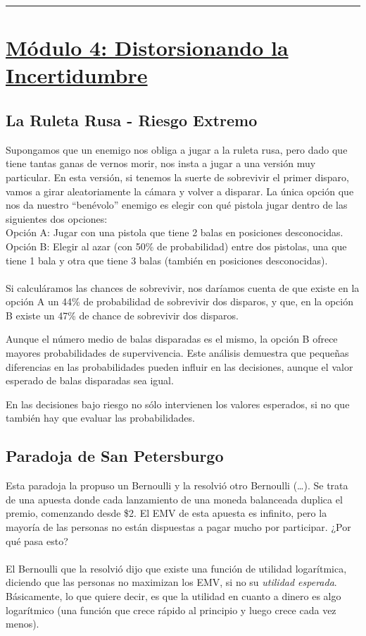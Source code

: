 \documentclass{article}
\newcommand*\sepline{%
  \begin{center}
    \rule[1ex]{.5\textwidth}{.5pt}
  \end{center}}
\begin{document}
    \sepline

    \section*{\underline{Módulo 4: Distorsionando la Incertidumbre}}
        \subsection*{La Ruleta Rusa - Riesgo Extremo}
            Supongamos que un enemigo nos obliga a jugar a la ruleta rusa, pero dado que tiene tantas ganas de vernos morir, nos insta a jugar a una versión muy particular. En esta versión, si tenemos la suerte de sobrevivir el primer disparo, vamos a girar aleatoriamente la cámara y volver a disparar. La única opción que nos da nuestro “benévolo” enemigo es elegir con qué pistola jugar dentro de las siguientes dos opciones: \\
            Opción A: Jugar con una pistola que tiene 2 balas en posiciones desconocidas. \\
            Opción B: Elegir al azar (con 50\% de probabilidad) entre dos pistolas, una que tiene 1 bala y otra que tiene 3 balas (también en posiciones desconocidas). \\
            \\
            Si calculáramos las chances de sobrevivir, nos daríamos cuenta de que existe en la opción A un 44\% de probabilidad de sobrevivir dos disparos, y que, en la opción B existe un 47\% de chance de sobrevivir dos disparos.

            Aunque el número medio de balas disparadas es el mismo, la opción B ofrece mayores probabilidades de supervivencia. Este análisis demuestra que pequeñas diferencias en las probabilidades pueden influir en las decisiones, aunque el valor esperado de balas disparadas sea igual.

            En las decisiones bajo riesgo no sólo intervienen los valores esperados, si no que también hay que evaluar las probabilidades.
        \subsection*{Paradoja de San Petersburgo}
            Esta paradoja la propuso un Bernoulli y la resolvió otro Bernoulli (\ldots). Se trata de una apuesta donde cada lanzamiento de una moneda balanceada duplica el premio, comenzando desde \$2. El EMV de esta apuesta es infinito, pero la mayoría de las personas no están dispuestas a pagar mucho por participar. ¿Por qué pasa esto? \\
            \\
            El Bernoulli que la resolvió dijo que existe una función de utilidad logarítmica, diciendo que las personas no maximizan los EMV, si no su \emph{utilidad esperada}. Básicamente, lo que quiere decir, es que la utilidad en cuanto a dinero es algo logarítmico (una función que crece rápido al principio y luego crece cada vez menos).
\end{document}
